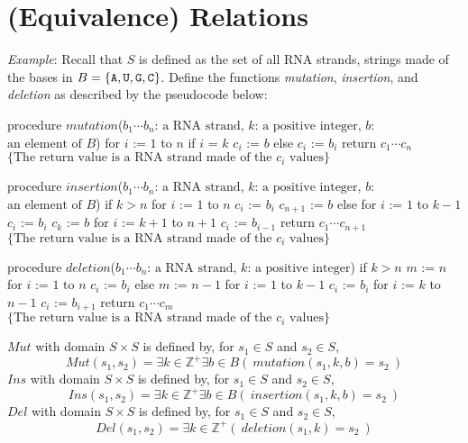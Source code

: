 \documentclass[12pt, oneside]{article}
\begin{document}
\section*{(Equivalence) Relations}
{\it Example}: Recall that $S$ is defined as the set of all RNA strands, strings made of the bases in 
 $B = \{\texttt{A},\texttt{U},\texttt{G},\texttt{C}\}$. Define the functions \textit{mutation}, \textit{insertion}, and \textit{deletion} as described by the pseudocode below:

\begin{algorithm}
procedure $\textit{mutation}$($b_1\cdots b_n$: $\textrm{a RNA strand}$, $k$: $\textrm{a  positive integer}$, $b$: $\textrm{an  element of } B$)
for $i$ := $1$ to $n$
  if $i$ = $k$
    $c_i$ := $b$
  else
    $c_i$ := $b_i$
return $c_1\cdots c_n$ $\{ \textrm{The return value is a RNA strand made of the } c_i \textrm{ values}\}$
\end{algorithm}

\begin{algorithm}
procedure $\textit{insertion}$($b_1\cdots b_n$: $\textrm{a RNA strand}$, $k$: $\textrm{a  positive integer}$, $b$: $\textrm{an  element of } B$)
if $k > n$
  for $i$ := $1$ to $n$
    $c_i$ := $b_i$
  $c_{n+1}$ := $b$
else 
  for $i$ := $1$ to $k-1$
    $c_i$ := $b_i$
  $c_k$ := $b$
  for $i$ := $k+1$ to $n+1$
    $c_i$ := $b_{i-1}$
return $c_1\cdots c_{n+1}$ $\{ \textrm{The return value is a RNA strand made of the } c_i \textrm{ values}\}$
\end{algorithm}

\begin{algorithm}
procedure $\textit{deletion}$($b_1\cdots b_n$: $\textrm{a RNA strand}$, $k$: $\textrm{a  positive integer}$)
if $k > n$
  $m$ := $n$
  for $i$ := $1$ to $n$
    $c_i$ := $b_i$
else
  $m$ := $n-1$
  for $i$ := $1$ to $k-1$ 
    $c_i$ := $b_i$
  for $i$ := $k$ to $n-1$
    $c_i$ := $b_{i+1}$
return $c_1\cdots c_m$ $\{ \textrm{The return value is a RNA strand made of the } c_i \textrm{ values}\}$
\end{algorithm}


$Mut$ with domain $S \times S$ is defined by, for $s_1 \in S$ and $s_2 \in S$,
\[
Mut(s_1,s_2) = \exists k\in \mathbb{Z^+} \exists b \in B (~ mutation(s_1, k, b) = s_2~)
\]
$Ins$ with domain $S \times S$ is defined by, for $s_1 \in S$ and $s_2 \in S$,
\[
Ins(s_1,s_2) = \exists k\in \mathbb{Z^+} \exists b \in B (~ insertion(s_1, k, b) = s_2~)
\]
$Del$ with domain $S \times S$ is defined by, for $s_1 \in S$ and $s_2 \in S$,
\[
Del(s_1,s_2) = \exists k\in \mathbb{Z^+} (~ deletion(s_1, k) = s_2~)
\]
\end{document}
